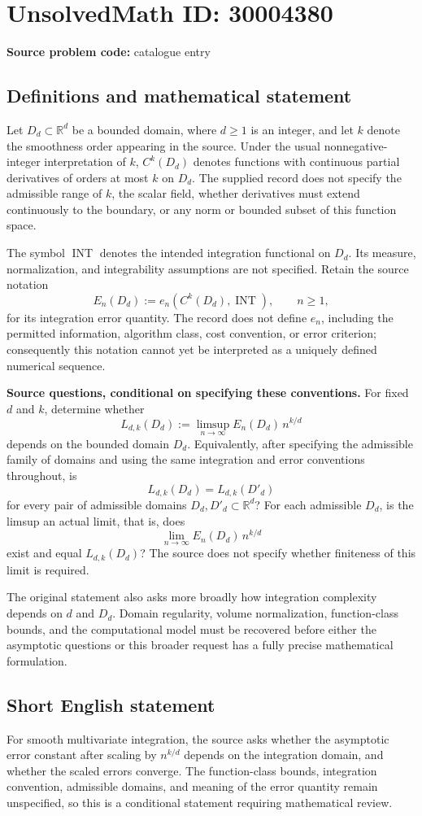 \documentclass[11pt]{article}
\newcommand{\R}{\mathbb{R}}
\begin{document}
\section*{UnsolvedMath ID: 30004380}
\textbf{Source problem code:} catalogue entry
\subsection{Definitions and mathematical statement}
Let \(D_d\subset\R^d\) be a bounded domain, where \(d\geq 1\) is an integer, and let \(k\) denote the smoothness order appearing in the source. Under the usual nonnegative-integer interpretation of \(k\), \(C^k(D_d)\) denotes functions with continuous partial derivatives of orders at most \(k\) on \(D_d\). The supplied record does not specify the admissible range of \(k\), the scalar field, whether derivatives must extend continuously to the boundary, or any norm or bounded subset of this function space.

The symbol \(\operatorname{INT}\) denotes the intended integration functional on \(D_d\). Its measure, normalization, and integrability assumptions are not specified. Retain the source notation
\[
E_n(D_d):=e_n(C^k(D_d),\operatorname{INT}),\qquad n\geq 1,
\]
for its integration error quantity. The record does not define \(e_n\), including the permitted information, algorithm class, cost convention, or error criterion; consequently this notation cannot yet be interpreted as a uniquely defined numerical sequence.

\textbf{Source questions, conditional on specifying these conventions.} For fixed \(d\) and \(k\), determine whether
\[
L_{d,k}(D_d):=\limsup_{n\to\infty}E_n(D_d)\,n^{k/d}
\]
depends on the bounded domain \(D_d\). Equivalently, after specifying the admissible family of domains and using the same integration and error conventions throughout, is
\[
L_{d,k}(D_d)=L_{d,k}(D'_d)
\]
for every pair of admissible domains \(D_d,D'_d\subset\R^d\)? For each admissible \(D_d\), is the limsup an actual limit, that is, does
\[
\lim_{n\to\infty}E_n(D_d)\,n^{k/d}
\]
exist and equal \(L_{d,k}(D_d)\)? The source does not specify whether finiteness of this limit is required.

The original statement also asks more broadly how integration complexity depends on \(d\) and \(D_d\). Domain regularity, volume normalization, function-class bounds, and the computational model must be recovered before either the asymptotic questions or this broader request has a fully precise mathematical formulation.
\subsection{Short English statement}
For smooth multivariate integration, the source asks whether the asymptotic error constant after scaling by \(n^{k/d}\) depends on the integration domain, and whether the scaled errors converge. The function-class bounds, integration convention, admissible domains, and meaning of the error quantity remain unspecified, so this is a conditional statement requiring mathematical review.
\end{document}
